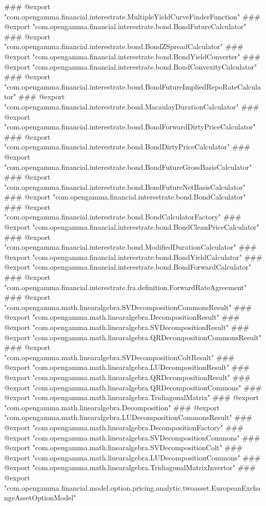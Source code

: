 ### @export "com.opengamma.financial.interestrate.MultipleYieldCurveFinderFunction"
### @export "com.opengamma.financial.interestrate.bond.BondFutureCalculator"
### @export "com.opengamma.financial.interestrate.bond.BondZSpreadCalculator"
### @export "com.opengamma.financial.interestrate.bond.BondYieldConverter"
### @export "com.opengamma.financial.interestrate.bond.BondConvexityCalculator"
### @export "com.opengamma.financial.interestrate.bond.BondFutureImpliedRepoRateCalculator"
### @export "com.opengamma.financial.interestrate.bond.MacaulayDurationCalculator"
### @export "com.opengamma.financial.interestrate.bond.BondForwardDirtyPriceCalculator"
### @export "com.opengamma.financial.interestrate.bond.BondDirtyPriceCalculator"
### @export "com.opengamma.financial.interestrate.bond.BondFutureGrossBasisCalculator"
### @export "com.opengamma.financial.interestrate.bond.BondFutureNetBasisCalculator"
### @export "com.opengamma.financial.interestrate.bond.BondCalculator"
### @export "com.opengamma.financial.interestrate.bond.BondCalculatorFactory"
### @export "com.opengamma.financial.interestrate.bond.BondCleanPriceCalculator"
### @export "com.opengamma.financial.interestrate.bond.ModifiedDurationCalculator"
### @export "com.opengamma.financial.interestrate.bond.BondYieldCalculator"
### @export "com.opengamma.financial.interestrate.bond.BondForwardCalculator"
### @export "com.opengamma.financial.interestrate.fra.definition.ForwardRateAgreement"
### @export "com.opengamma.math.linearalgebra.SVDecompositionCommonsResult"
### @export "com.opengamma.math.linearalgebra.DecompositionResult"
### @export "com.opengamma.math.linearalgebra.SVDecompositionResult"
### @export "com.opengamma.math.linearalgebra.QRDecompositionCommonsResult"
### @export "com.opengamma.math.linearalgebra.SVDecompositionColtResult"
### @export "com.opengamma.math.linearalgebra.LUDecompositionResult"
### @export "com.opengamma.math.linearalgebra.QRDecompositionResult"
### @export "com.opengamma.math.linearalgebra.QRDecompositionCommons"
### @export "com.opengamma.math.linearalgebra.TridiagonalMatrix"
### @export "com.opengamma.math.linearalgebra.Decomposition"
### @export "com.opengamma.math.linearalgebra.LUDecompositionCommonsResult"
### @export "com.opengamma.math.linearalgebra.DecompositionFactory"
### @export "com.opengamma.math.linearalgebra.SVDecompositionCommons"
### @export "com.opengamma.math.linearalgebra.SVDecompositionColt"
### @export "com.opengamma.math.linearalgebra.LUDecompositionCommons"
### @export "com.opengamma.math.linearalgebra.TridiagonalMatrixInvertor"
### @export "com.opengamma.financial.model.option.pricing.analytic.twoasset.EuropeanExchangeAssetOptionModel"
